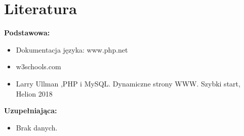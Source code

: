 \documentclass[12pt, a4paper]{article}
\begin{document}
\section{Literatura}

\textbf{Podstawowa:}
\begin{itemize}
  \item Dokumentacja języka: www.php.net
  \item w3schools.com
  \item Larry Ullman ,PHP i MySQL. Dynamiczne strony WWW. Szybki start, Helion 2018
\end{itemize}

\textbf{Uzupełniająca:}
\begin{itemize}
  \item Brak danych.
\end{itemize}
\end{document}

